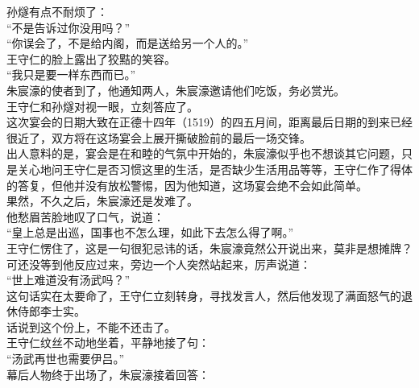 \begin{multicols}{\theparacolNo}
孙燧有点不耐烦了：\\

“不是告诉过你没用吗？”\\

“你误会了，不是给内阁，而是送给另一个人的。”\\

王守仁的脸上露出了狡黠的笑容。\\

“我只是要一样东西而已。”\\

朱宸濠的使者到了，他通知两人，朱宸濠邀请他们吃饭，务必赏光。\\

王守仁和孙燧对视一眼，立刻答应了。\\

这次宴会的日期大致在正德十四年（1519）的四五月间，距离最后日期的到来已经很近了，双方将在这场宴会上展开撕破脸前的最后一场交锋。\\

出人意料的是，宴会是在和睦的气氛中开始的，朱宸濠似乎也不想谈其它问题，只是关心地问王守仁是否习惯这里的生活，是否缺少生活用品等等，王守仁作了得体的答复，但他并没有放松警惕，因为他知道，这场宴会绝不会如此简单。\\

果然，不久之后，朱宸濠还是发难了。\\

他愁眉苦脸地叹了口气，说道：\\

“皇上总是出巡，国事也不怎么理，如此下去怎么得了啊。”\\

王守仁愣住了，这是一句很犯忌讳的话，朱宸濠竟然公开说出来，莫非是想摊牌？\\

可还没等到他反应过来，旁边一个人突然站起来，厉声说道：\\

“世上难道没有汤武吗？”\\

这句话实在太要命了，王守仁立刻转身，寻找发言人，然后他发现了满面怒气的退休侍郎李士实。\\

话说到这个份上，不能不还击了。\\

王守仁纹丝不动地坐着，平静地接了句：\\

“汤武再世也需要伊吕。”\\

幕后人物终于出场了，朱宸濠接着回答：\\


\end{multicols}
